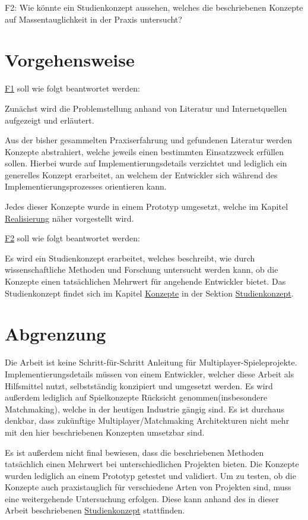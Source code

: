 \label{f2} \textsf{\Large F2:} Wie könnte ein Studienkonzept aussehen, welches die beschriebenen Konzepte auf Massentauglichkeit in der Praxis untersucht?


\section{Vorgehensweise}

\hyperref[f1]{F1} soll wie folgt beantwortet werden:

Zunächst wird die Problemstellung anhand von Literatur und Internetquellen aufgezeigt und erläutert. 

Aus der bisher gesammelten Praxiserfahrung und gefundenen Literatur werden Konzepte abstrahiert, welche jeweils einen bestimmten Einsatzzweck erfüllen sollen. Hierbei wurde auf Implementierungsdetails verzichtet und lediglich ein generelles Konzept erarbeitet, an welchem der Entwickler sich während des Implementierungsprozesses orientieren kann.

Jedes dieser Konzepte wurde in einem Prototyp umgesetzt, welche im Kapitel \hyperref[sec:realisierung]{Realisierung} näher vorgestellt wird.

\hyperref[f2]{F2} soll wie folgt beantwortet werden:

Es wird ein Studienkonzept erarbeitet, welches beschreibt, wie durch wissenschaftliche Methoden und Forschung untersucht werden kann, ob die Konzepte einen tatsächlichen Mehrwert für angehende Entwickler bietet. Das Studienkonzept findet sich im Kapitel \hyperref[sec:konzepte]{Konzepte} in der Sektion \hyperref[sec:studienkonzept]{Studienkonzept}.

\section{Abgrenzung}

Die Arbeit ist keine Schritt-für-Schritt Anleitung für Multiplayer-Spieleprojekte. Implementierungsdetails müssen von einem Entwickler, welcher diese Arbeit als Hilfsmittel nutzt, selbstständig konzipiert und umgesetzt werden. Es wird außerdem lediglich auf Spielkonzepte Rücksicht genommen(insbesondere Matchmaking), welche in der heutigen Industrie gängig sind\cite{Wikipedia.2021b}. Es ist durchaus denkbar, dass zukünftige Multiplayer/Matchmaking Architekturen nicht mehr mit den hier beschriebenen Konzepten umsetzbar sind.

Es ist außerdem nicht final bewiesen, dass die beschriebenen Methoden tatsächlich einen Mehrwert bei unterschiedlichen Projekten bieten. Die Konzepte wurden lediglich an einem Prototyp getestet und validiert. Um zu testen, ob die Konzepte auch praxistauglich für verschiedene Arten von Projekten sind, muss eine weitergehende Untersuchung erfolgen. Diese kann anhand des in dieser Arbeit beschriebenen \hyperref[sec:studienkonzept]{Studienkonzept} stattfinden. 

